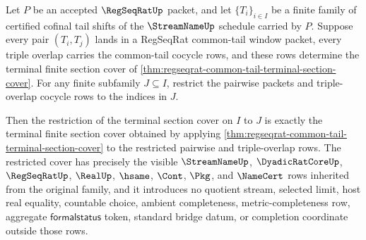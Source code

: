 \begin{theorem}
\label{thm:regseqrat-common-tail-terminal-section-restriction-exactness}
Let $P$ be an accepted $\RegSeqRatUp$ packet, and let $\{T_i\}_{i \in I}$ be a finite family of certified cofinal tail shifts of the $\StreamNameUp$ schedule carried by $P$. Suppose every pair $(T_i,T_j)$ lands in a RegSeqRat common-tail window packet, every triple overlap carries the common-tail cocycle rows, and these rows determine the terminal finite section cover of \autoref{thm:regseqrat-common-tail-terminal-section-cover}. For any finite subfamily $J \subseteq I$, restrict the pairwise packets and triple-overlap cocycle rows to the indices in $J$.

Then the restriction of the terminal section cover on $I$ to $J$ is exactly the terminal finite section cover obtained by applying \autoref{thm:regseqrat-common-tail-terminal-section-cover} to the restricted pairwise and triple-overlap rows. The restricted cover has precisely the visible $\StreamNameUp$, $\DyadicRatCoreUp$, $\RegSeqRatUp$, $\RealUp$, $\hsame$, $\Cont$, $\Pkg$, and $\NameCert$ rows inherited from the original family, and it introduces no quotient stream, selected limit, host real equality, countable choice, ambient completeness, metric-completeness row, aggregate $\mathsf{formalstatus}$ token, standard bridge datum, or completion coordinate outside those rows.
\end{theorem}
